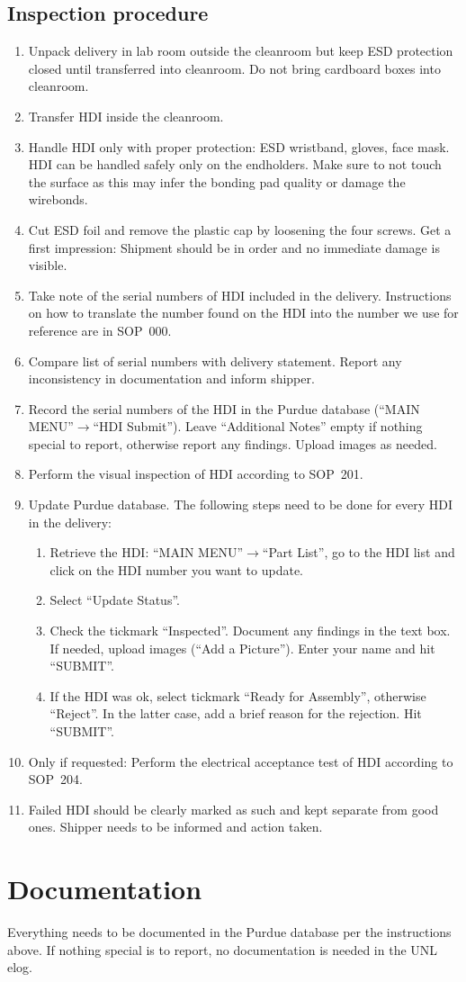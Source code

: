 \documentclass[12pt]{unlsilabsop}
\begin{document}
\subsection{Inspection procedure}
\begin{enumerate}
    \item Unpack delivery in lab room outside the cleanroom but keep ESD protection closed until transferred into cleanroom. Do not bring cardboard boxes into cleanroom.
    \item Transfer HDI inside the cleanroom.
    \item Handle HDI only with proper protection: ESD wristband, gloves, face mask. HDI can be handled safely only on the endholders. Make sure to not touch the surface as this may infer the bonding pad quality or damage the wirebonds.
    \item Cut ESD foil and remove the plastic cap by loosening the four screws. Get a first impression: Shipment should be in order and no immediate damage is visible.
    \item Take note of the serial numbers of HDI included in the delivery. Instructions on how to translate the number found on the HDI into the number we use for reference are in SOP~000.
    \item Compare list of serial numbers with delivery statement. Report any inconsistency in documentation and inform shipper.
    \item Record the serial numbers of the HDI in the Purdue database (``MAIN MENU''$\rightarrow$``HDI Submit''). Leave ``Additional Notes'' empty if nothing special to report, otherwise report any findings. Upload images as needed.
    \item Perform the visual inspection of HDI according to SOP~201.
    \item Update Purdue database. The following steps need to be done for every HDI in the delivery:
    \begin{enumerate}
        \item Retrieve the HDI: ``MAIN MENU''$\rightarrow$``Part List'', go to the HDI list and click on the HDI number you want to update.
        \item Select ``Update Status''.
        \item Check the tickmark ``Inspected''. Document any findings in the text box. If needed, upload images (``Add a Picture''). Enter your name and hit ``SUBMIT''.
        \item If the HDI was ok, select tickmark ``Ready for Assembly'', otherwise ``Reject''. In the latter case, add a brief reason for the rejection. Hit ``SUBMIT''.
    \end{enumerate}
    \item Only if requested: Perform the electrical acceptance test of HDI according to SOP~204.
    \item Failed HDI should be clearly marked as such and kept separate from good ones. Shipper needs to be informed and action taken.
\end{enumerate}

\section{Documentation}
Everything needs to be documented in the Purdue database per the instructions above. If nothing special is to report, no documentation is needed in the UNL elog.
\end{document}

